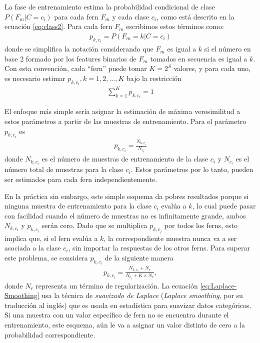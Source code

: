 		La fase de entrenamiento estima la probabilidad condicional de clase $P(F_m|C=c_i)$ para cada fern $F_m$	 y cada clase $c_i$, como está descrito en la ecuación \ref{eq:class2}. Para cada fern $F_m$ escribimos estos términos como:
		\begin{align}
			p_{k,c_i} = P(F_m = k | C = c_i)
		\end{align}
		donde se simplifica la notación considerando que $F_m$ es igual a $k$ si el número en base $2$ formado por los features binarios de $F_m$ tomados en secuencia es igual a $k$. Con esta convención, cada ``fern'' puede tomar $K=2^S$ valores, y para cada uno, es necesario estimar $p_{k,c_i}, k=1,2,\dots,K$ bajo la restricción
		\begin{align*}
			\sum_{k=1}^Kp_{k,c_i} = 1
		\end{align*}		
		
		El enfoque más simple sería asignar la estimación de máxima ve\-ro\-si\-mi\-li\-tud a estos parámetros a partir de las muestras de entrenamiento. Para el parámetro $p_{k,c_i}$ es
		\begin{align*}
			p_{k,c_i} = \frac{N_{k,c_i}}{N_{c_i}}
		\end{align*}
		donde $N_{k,c_i}$ es el número de muestras de entrenamiento de la clase $c_i$ y $N_{c_i}$ es el número total de muestras para la clase $c_i$. Estos parámetros por lo tanto, pueden ser estimados para cada fern independientemente.
		
		En la práctica sin embargo, este simple esquema da pobres resultados porque si ninguna muestra de entrenamiento para la clase $c_i$ evalúa a $k$, lo cual puede pasar con facilidad cuando el número de muestras no es infinitamente grande, ambos $N_{k,c_i}$ y $p_{k,c_i}$ serán cero. Dado que se multiplica $p_{k,c_j}$ por todos los ferns, esto implica que, si el fern evalúa a $k$, la correspondiente muestra nunca va a ser asociada a la clase $c_i$, sin importar la respuestas de los otros ferns. Para superar este problema, se considera $p_{k,c_i}$ de la siguiente manera
		\begin{align}
			\label{eq:Laplace-Smoothing}
			p_{k,c_i} = \frac{N_{k,c_i} + N_r}{N_{c_i} + K \times N_r},
		\end{align}
		donde $N_r$ representa un término de regularización. La ecuación \ref{eq:Laplace-Smoothing} usa la técnica de \textit{suavizado de Laplace} (\textit{Laplace smoothing}, por su traducción al inglés) que es usada en estadística para suavizar datos categóricos. Si una muestra con un valor específico de fern no se encuentra durante el entrenamiento, este esquema, aún le va a asignar un valor distinto de cero a la probabilidad correspondiente.